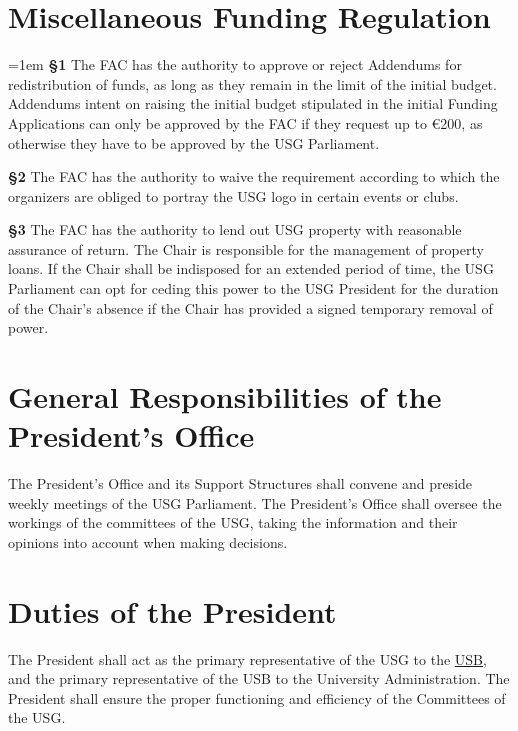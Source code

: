 \documentclass[12pt]{LaTeX_Misc/constitution}
\begin{document}
\section{Miscellaneous Funding Regulation}
{\parindent=1em
\textbf{\S{}1} 
The FAC has the authority to approve or reject Addendums for redistribution of funds, as long as they remain in the limit of the initial budget. Addendums intent on raising the initial budget stipulated in the initial Funding Applications can only be approved by the FAC if they request up to $\euro$200, as otherwise they have to be approved by the USG Parliament.

\textbf{\S{}2} The FAC has the authority to waive the requirement according to which the organizers are obliged to portray the USG logo in certain events or clubs.

\textbf{\S{}3} The FAC has the authority to lend out USG property with reasonable assurance of return. The Chair is responsible for the management of property loans. If the Chair shall be indisposed for an extended period of time, the USG Parliament can opt for ceding this power to the USG President for the duration of the Chair's absence if the Chair has provided a signed temporary removal of power.}


\label{PresByLawsDef}
\section{General Responsibilities of the President's Office}
The President's Office and its Support Structures shall convene and preside weekly meetings of the USG Parliament. The President's Office shall oversee the workings of the committees of the USG, taking the information and their opinions into account when making decisions.

\section{Duties of the President}
\label{PresDef}
The President shall act as the primary representative of the USG to the \hyperref[studentbody]{USB}, and the primary representative of the USB to the University Administration.
The President shall ensure the proper functioning and efficiency of the Committees of the USG.

\end{document}
